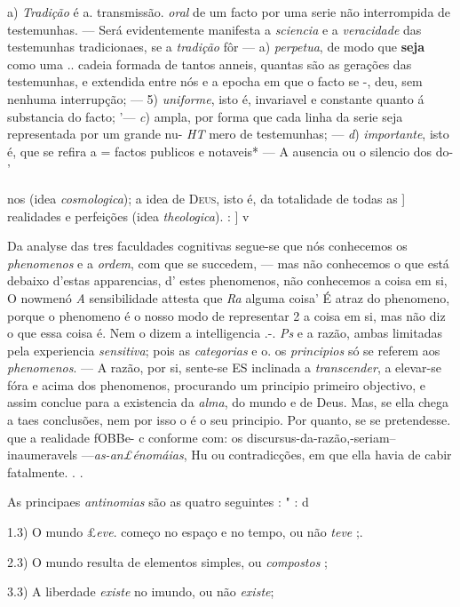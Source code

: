 a) \emph{Tradição} é a. transmissão. \emph{oral} de um facto por uma serie   não interrompida de testemunhas. --- Será evidentemente manifesta a \emph{sciencia} e a \emph{veracidade} das testemunhas tradicionaes, se a \emph{tradição} fôr --- a) \emph{perpetua}, de modo que \textbf{seja} como uma .. cadeia formada de tantos anneis, quantas são as gerações das   testemunhas, e extendida entre nós e a epocha em que o facto se -, deu, sem nenhuma interrupção; --- 5) \emph{uniforme}, isto é, invariavel e constante quanto á substancia do facto; '--- \emph{c}) ampla, por forma   que cada linha da serie seja representada por um grande nu- \emph{HT} mero de testemunhas; --- \emph{d}) \emph{importante}, isto é, que se refira a = factos publicos e notaveis* --- A ausencia ou o silencio dos do- '

nos (idea \emph{cosmologica}); a idea de \textsc{Deus}, isto é, da totalidade de todas as ] realidades e perfeições (idea \emph{theologica}). : ] v

Da analyse das tres faculdades cognitivas segue-se que nós conhecemos os \emph{phenomenos} e a \emph{ordem}, com que se succedem, --- mas não conhecemos o que está debaixo d'estas apparencias, d' estes phenomenos, não conhecemos a coisa em si, O nowmenó \emph{A} sensibilidade attesta que \emph{Ra} alguma coisa' É atraz do phenomeno, porque o phenomeno é o nosso modo de representar 2 a coisa em si, mas não diz o que essa coisa é. Nem o dizem a intelligencia .-. \emph{Ps} e a razão, ambas limitadas pela experiencia \emph{sensitiva}; pois as \emph{categorias} e o. os \emph{principios} só se referem aos \emph{phenomenos}. --- A razão, por si, sente-se ES inclinada a \emph{transcender}, a elevar-se fóra e acima dos phenomenos, procurando um principio primeiro objectivo, e assim conclue para a existencia da \emph{alma}, do mundo e de Deus. Mas, se ella chega a taes conclusões, nem por isso o é o seu principio. Por quanto, se se pretendesse. que a realidade fOBBe- c \textbar{} conforme com: os discursus-da-razão,-seriam-- inaumeravels ---\emph{as-an£énomáias}, Hu ou contradicções, em que ella havia de cabir fatalmente. . .

As principaes \emph{antinomias} são as quatro seguintes : " : d

1.3) O mundo £\emph{eve}. começo no espaço e no tempo, ou não \emph{teve} ;.

2.3) O mundo resulta de elementos simples, ou \emph{compostos} ;

3.3) A liberdade \emph{existe} no imundo, ou não \emph{existe};

